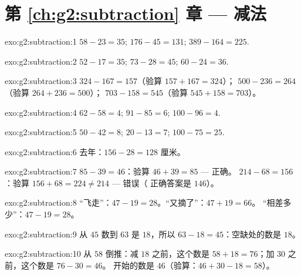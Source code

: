 \section*{第 \ref{ch:g2:subtraction} 章 --- 减法}

\begin{solution}{exo:g2:subtraction:1}
$58 - 23 = 35$; \quad $176 - 45 = 131$; \quad $389 - 164 = 225$.
\end{solution}

\begin{solution}{exo:g2:subtraction:2}
$52 - 17 = 35$; \quad $73 - 28 = 45$; \quad $60 - 24 = 36$.
\end{solution}

\begin{solution}{exo:g2:subtraction:3}
$324 - 167 = 157$（验算 $157 + 167 = 324$）； \quad
$500 - 236 = 264$（验算 $264 + 236 = 500$）； \quad
$703 - 158 = 545$（验算 $545 + 158 = 703$）。
\end{solution}

\begin{solution}{exo:g2:subtraction:4}
$62 - 58 = 4$; \quad $91 - 85 = 6$; \quad $100 - 96 = 4$.
\end{solution}

\begin{solution}{exo:g2:subtraction:5}
$50 - 42 = 8$; \quad $20 - 13 = 7$; \quad $100 - 75 = 25$.
\end{solution}

\begin{solution}{exo:g2:subtraction:6}
去年：$156 - 28 = 128$ 厘米。
\end{solution}

\begin{solution}{exo:g2:subtraction:7}
$85 - 39 = 46$：验算 $46 + 39 = 85$ --- 正确。
$214 - 68 = 156$：验算 $156 + 68 = 224 \neq 214$ --- 错误（
正确答案是 $146$）。
\end{solution}

\begin{solution}{exo:g2:subtraction:8}
“飞走”：$47 - 19 = 28$。“又摘了”：$47 + 19 = 66$。
“相差多少”：$47 - 19 = 28$。
\end{solution}

\begin{solution}{exo:g2:subtraction:9}
从 $45$ 数到 $63$ 是 $18$，所以 $63 - 18 = 45$：空缺处的数是 $18$。
\end{solution}

\begin{solution}{exo:g2:subtraction:10}
从 $58$ 倒推：减 $18$ 之前，这个数是
$58 + 18 = 76$；加 $30$ 之前，这个数是 $76 - 30 = 46$。
开始的数是 $46$（验算：$46 + 30 - 18 = 58$）。
\end{solution}
